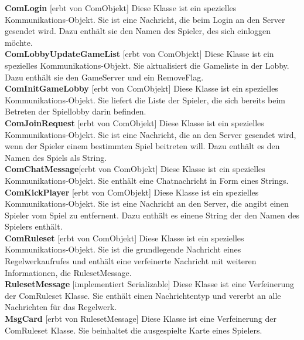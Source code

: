 \documentclass{article}
\begin{document}
\textbf{ComLogin} [erbt von ComObjekt] Diese Klasse ist ein spezielles Kommunikations-Objekt. Sie ist eine Nachricht, die beim Login an den Server gesendet wird. Dazu enthält sie den Namen des Spieler, des sich einloggen möchte.\\
		
\textbf{ComLobbyUpdateGameList} [erbt von ComObjekt] Diese Klasse ist ein spezielles Kommunikations-Objekt. Sie aktualisiert die Gameliste in der Lobby. Dazu enthält sie den GameServer und ein RemoveFlag.\\
		
\textbf{ComInitGameLobby} [erbt von ComObjekt] Diese Klasse ist ein spezielles Kommunikations-Objekt. Sie liefert die Liste der Spieler, die sich bereits beim Betreten der Spiellobby darin befinden. \\

\textbf{ComJoinRequest} [erbt von ComObjekt] Diese Klasse ist ein spezielles Kommunikations-Objekt. Sie ist eine Nachricht, die an den Server gesendet wird, wenn der Spieler einem bestimmten Spiel beitreten will. Dazu enthält es den Namen des Spiels als String. \\
		
\textbf{ComChatMessage}[erbt von ComObjekt] Diese Klasse ist ein spezielles Kommunikations-Objekt. Sie enthält eine Chatnachricht in Form eines Strings.\\

\textbf{ComKickPlayer} [erbt von ComObjekt] Diese Klasse ist ein spezielles Kommunikations-Objekt. Sie ist eine Nachricht an den Server, die angibt einen Spieler vom Spiel zu entfernent. Dazu enthält es einene String der den Namen des Spielers enthält. \\
		
\textbf{ComRuleset} [erbt von ComObjekt] Diese Klasse ist ein spezielles Kommunikations-Objekt. Sie ist die grundlegende Nachricht eines Regelwerkaufrufes und enthält eine verfeinerte Nachricht mit weiteren Informationen, die RulesetMessage. \\
		
\textbf{RulesetMessage} [implementiert Serializable] Diese Klasse ist eine Verfeinerung der ComRuleset Klasse. Sie enthält einen Nachrichtentyp und vererbt an alle Nachrichten für das Regelwerk.\\
		
\textbf{MsgCard} [erbt von RulesetMessage] Diese Klasse ist eine Verfeinerung der ComRuleset Klasse. Sie beinhaltet die ausgespielte Karte eines Spielers.\\
		
\end{document}
